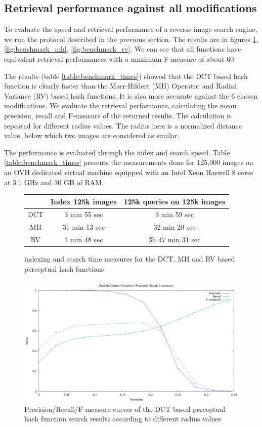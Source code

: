 \subsection{Retrieval performance against all modifications}
To evaluate the speed and retrieval performance of a reverse image search engine, we run the protocol described in the previous section. The results are in figures \ref{fig:benchmark_dct}, \ref{fig:benchmark_mh}, \ref{fig:benchmark_rv}. We can see that all functions have equivalent retrieval performances with a maximum F-measure of about 60%

The results (table \ref{table:benchmark_times}) showed that the DCT based hash function is clearly faster than the Marr-Hildert (MH) Operator and Radial Variance (RV) based hash functions. It is also more accurate against the 6 chosen modifications. We evaluate the retrieval performance, calculating the mean precision, recall and F-measure of the returned results. The calculation is repeated for different radius values. The radius here is a normalized distance value, below which two images are considered as similar.

The performance is evaluated through the index and search speed. Table \ref{table:benchmark_times} presents the measurements done for 125,000 images on an OVH dedicated virtual machine equipped with an Intel Xeon Haswell 8 cores at 3.1 GHz and 30 GB of RAM.

\begin{figure}
	\centering
	\begin{tabular}{|c|c|c|}
		\hline
				& Index 125k images   & 125k queries on 125k images \\
		\hline
		DCT & 3 min 55 sec        & 3 min 59 sec                \\
		\hline
		MH  & 31 min 13 sec       & 32 min 20 sec               \\
		\hline
		RV  & 1 min 48 sec        & 3h 47 min 31 sec            \\
		\hline
	\end{tabular}
	\caption{indexing and search time measures for the DCT, MH and RV based perceptual hash functions}
	\label{table:benchmark_times}
	
	\includegraphics[width=\textwidth]{img/benchmark_dct.png}
	\caption{Precision/Recall/F-measure curves of the DCT based perceptual hash function search results according to different radius values}
	\label{fig:benchmark_dct}
\end{figure}

